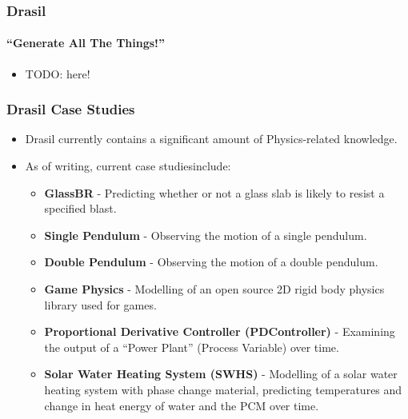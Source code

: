 \documentclass{beamer}
\begin{document}
\begin{frame}
\end{frame}

\begin{frame}
    \frametitle{Drasil}
    \framesubtitle{``Generate All The Things!''}
    
    \begin{itemize}
        \item TODO: here!
    \end{itemize}
\end{frame}

\begin{frame}
    \frametitle{Drasil Case Studies}
    \begin{itemize}
        \item<2-> Drasil currently contains a significant amount of Physics-related knowledge.
        \item<3-> As of writing, current case studies\footnotemark[1] include:
            \begin{itemize}
                \item<4-> \textbf{GlassBR} - Predicting whether or not a glass slab is likely to resist a specified blast.
                \item<5-> \textbf{Single Pendulum} - Observing the motion of a single pendulum.
                \item<6-> \textbf{Double Pendulum} - Observing the motion of a double pendulum.
                \item<7-> \textbf{Game Physics} - Modelling of an open source 2D rigid body physics library used for games.
                \item<8-> \textbf{Proportional Derivative Controller (PDController)} - Examining the output of a ``Power Plant'' (Process Variable) over time.
                \item<9-> \textbf{Solar Water Heating System (SWHS)} - Modelling of a solar water heating system with phase change material, predicting temperatures and change in heat energy of water and the PCM over time.
            \end{itemize}
    \end{itemize}

\end{frame}
\end{document}
